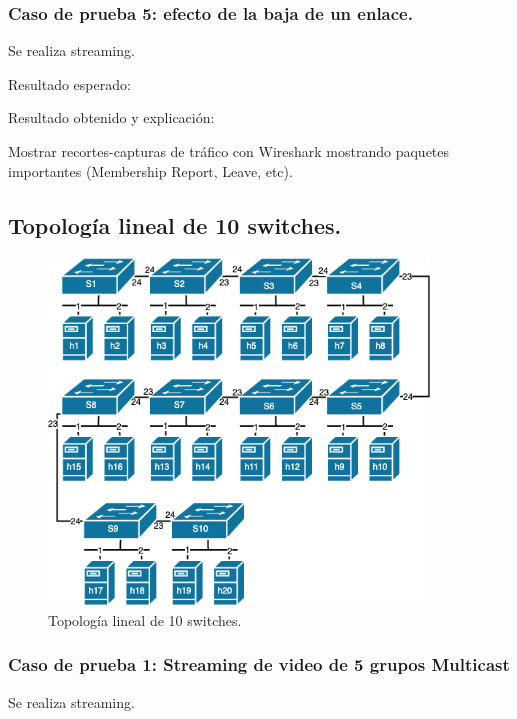 \documentclass[12pt,a4paper,oneside]{book}
\begin{document}
\subsubsection{Caso de prueba 5: efecto de la baja de un enlace.} 
Se realiza streaming.

\vspace{0.5cm}
Resultado esperado: 

\vspace{0.5cm}
Resultado obtenido y explicación: 

\vspace{0.5cm}
Mostrar recortes-capturas de tráfico con Wireshark mostrando paquetes importantes (Membership Report, Leave, etc).





\subsection{Topología lineal de 10 switches.}

\begin{figure}[ht]
 \centering
 \includegraphics[width=0.9\textwidth]{fotos/5_Pruebas/1_topo_lineales/grande.png}
 \caption{Topología lineal de 10 switches.}
 \label{topo_lineal_grande}
\end{figure}


\subsubsection{Caso de prueba 1: Streaming de video de 5 grupos Multicast} 
Se realiza streaming.
\end{document}
